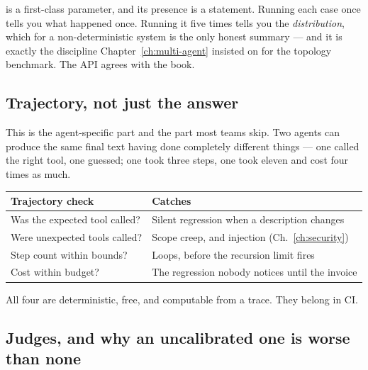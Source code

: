 \begin{note}
 is a first-class parameter, and its presence is a
statement. Running each case once tells you what happened once. Running it five
times tells you the \emph{distribution}, which for a non-deterministic system is
the only honest summary --- and it is exactly the discipline
Chapter~\ref{ch:multi-agent} insisted on for the topology benchmark. The API
agrees with the book.
\end{note}


\subsection{Trajectory, not just the answer}
\label{sec:trajectory}

This is the agent-specific part and the part most teams skip. Two agents can
produce the same final text having done completely different things --- one
called the right tool, one guessed; one took three steps, one took eleven and
cost four times as much.

\begin{center}
\small
\begin{tabularx}{\linewidth}{@{}lX@{}}
\toprule
\textbf{Trajectory check} & \textbf{Catches} \\
\midrule
Was the expected tool called? & Silent regression when a description changes \\[3pt]
Were unexpected tools called? & Scope creep, and injection
  (Ch.~\ref{ch:security}) \\[3pt]
Step count within bounds? & Loops, before the recursion limit fires \\[3pt]
Cost within budget? & The regression nobody notices until the invoice \\
\bottomrule
\end{tabularx}
\end{center}

All four are deterministic, free, and computable from a trace. They belong in CI.

\subsection{Judges, and why an uncalibrated one is worse than none}
\label{sec:judges}

